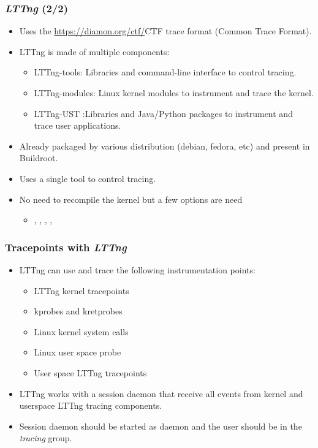 \begin{frame}
  \frametitle{{\em LTTng} (2/2)}
  \begin{itemize}
    \item Uses the \url{https://diamon.org/ctf/}{CTF} trace format (Common
          Trace Format).
    \item LTTng is made of multiple components:
    \begin{itemize}
      \item LTTng-tools: Libraries and command-line interface to control tracing.
      \item LTTng-modules: Linux kernel modules to instrument and trace the kernel.
      \item LTTng-UST :Libraries and Java/Python packages to instrument and trace user applications.
    \end{itemize}
    \item Already packaged by various distribution (debian, fedora, etc) and
          present in Buildroot.
    \item Uses a single tool  to control tracing.
    \item No need to recompile the kernel but a few options are need
    \begin{itemize}
      \item {}, , ,
            , 
    \end{itemize}
  \end{itemize}
\end{frame}

\begin{frame}
  \frametitle{Tracepoints with {\em LTTng} }
  \begin{itemize}
    \item LTTng can use and trace the following instrumentation points:
    \begin{itemize}
      \item LTTng kernel tracepoints
      \item kprobes and kretprobes
      \item Linux kernel system calls
      \item Linux user space probe
      \item User space LTTng tracepoints
    \end{itemize}
    \item LTTng works with a session daemon that receive all events from kernel
          and userspace LTTng tracing components.
    \item Session daemon should be started as daemon and the user should be in
          the {\em tracing} group.
  \end{itemize}
\end{frame}


